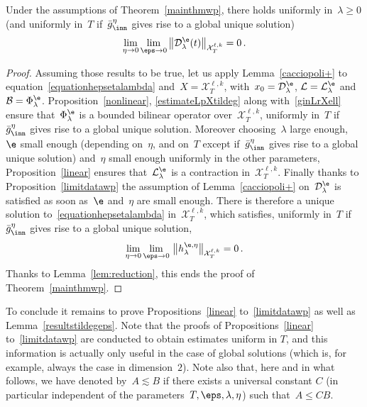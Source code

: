 \begin{prop}\label{limitdatawp}
Under the assumptions of Theorem~\ref{mainthmwp}, there holds uniformly in~$\lambda\geq 0$ (and uniformly in~$T$ if~$\bar g^\eta_{\inn}$ gives rise to a global unique solution)
\[
\lim_{\eta\to 0} \lim_{\eps\to 0} \big\| \mathcal{D}_\lambda^{\e}(t) \big\|_{\mathcal{X}_T^{\ell,k}}=0\,.
\]
\end{prop}
\begin{proof}
Assuming those results to be true, let us apply Lemma~\ref{cacciopoli+} to equation~\eqref{equationhepsetalambda} and~$X ={\mathcal X}_T^{\ell,k}$, with~$x_{0} = \mathcal{D}_\lambda^{\e}$, ${\mathcal L} = {\mathcal L} _\lambda ^{\e}$ and~${\mathcal B} = \Phi_\lambda ^{\e}$. Proposition~\ref{nonlinear}, \eqref{estimateLpXtildeg} along with~\eqref{ginLrXell} ensure that~$ \Phi ^{\e} _\lambda$ is a bounded bilinear operator over~$\mathcal{X}_T^{\ell,k} $, uniformly in~$T$ if~$\bar g_{\inn}^\eta$ gives rise to a global unique solution. Moreover choosing~$\lambda$ large enough,~$\e$ small enough (depending on~$\eta$, and on~$T$ except if~$\bar g^\eta_{\inn}$ gives rise to a global unique solution) and~$\eta$ small enough uniformly in the other parameters, Proposition~\ref{linear} ensures that~$ {\mathcal L}_\lambda ^{\e} $ is a contraction in~${\mathcal X}_T^{\ell,k}$. Finally thanks to Proposition~\ref{limitdatawp} the assumption of Lemma~\ref{cacciopoli+} on~$\mathcal{D}^{\e}_\lambda $ is satisfied as soon as~$\e$ and~$\eta$ are small enough. There is therefore a unique solution to~\eqref{equationhepsetalambda} in~$\mathcal{X}_T^{\ell,k}$, which satisfies, uniformly in~$T$ if~$\bar g^\eta_{\inn}$ gives rise to a global unique solution,
\begin{equation}\label{shorttimeestimate}
\lim_{\eta\to 0} \lim_{\eps\to 0} \, \big\| h_\lambda^{\e,\eta}
\big\|_{\mathcal{X}_T^{\ell,k}} = 0 \,.
\end{equation}
Thanks to Lemma~\ref{lem:reduction}, this ends the proof of Theorem~\ref{mainthmwp}.
\end{proof}

To conclude it remains to prove Propositions~\ref{linear} to~\ref{limitdatawp} as well as Lemma~\ref{resultstildegeps}. Note that the proofs of Propositions~\ref{linear} to~\ref{limitdatawp} are conducted to obtain estimates uniform in $T$, and this information is actually only useful in the case of global solutions (which is, for example, always the case in dimension~$2$). Note also that, here and in what follows, we have denoted by~$A \lesssim B$ if there exists a universal constant $C$ (in particular independent of the parameters~$T,\eps,\lambda,\eta$) such that~$A \leq CB$.

